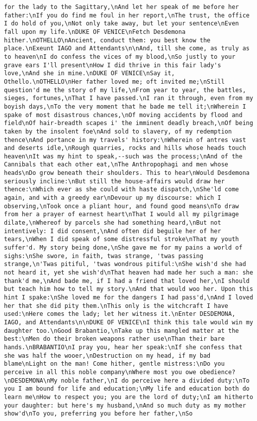 \begin{verbatim}
for the lady to the Sagittary,\nAnd let her speak of me before her father:\nIf you do find me foul in her report,\nThe trust, the office I do hold of you,\nNot only take away, but let your sentence\nEven fall upon my life.\nDUKE OF VENICE\nFetch Desdemona hither.\nOTHELLO\nAncient, conduct them: you best know the place.\nExeunt IAGO and Attendants\n\nAnd, till she come, as truly as to heaven\nI do confess the vices of my blood,\nSo justly to your grave ears I'll present\nHow I did thrive in this fair lady's love,\nAnd she in mine.\nDUKE OF VENICE\nSay it, Othello.\nOTHELLO\nHer father loved me; oft invited me;\nStill question'd me the story of my life,\nFrom year to year, the battles, sieges, fortunes,\nThat I have passed.\nI ran it through, even from my boyish days,\nTo the very moment that he bade me tell it;\nWherein I spake of most disastrous chances,\nOf moving accidents by flood and field\nOf hair-breadth scapes i' the imminent deadly breach,\nOf being taken by the insolent foe\nAnd sold to slavery, of my redemption thence\nAnd portance in my travels' history:\nWherein of antres vast and deserts idle,\nRough quarries, rocks and hills whose heads touch heaven\nIt was my hint to speak,--such was the process;\nAnd of the Cannibals that each other eat,\nThe Anthropophagi and men whose heads\nDo grow beneath their shoulders. This to hear\nWould Desdemona seriously incline:\nBut still the house-affairs would draw her thence:\nWhich ever as she could with haste dispatch,\nShe'ld come again, and with a greedy ear\nDevour up my discourse: which I observing,\nTook once a pliant hour, and found good means\nTo draw from her a prayer of earnest heart\nThat I would all my pilgrimage dilate,\nWhereof by parcels she had something heard,\nBut not intentively: I did consent,\nAnd often did beguile her of her tears,\nWhen I did speak of some distressful stroke\nThat my youth suffer'd. My story being done,\nShe gave me for my pains a world of sighs:\nShe swore, in faith, twas strange, 'twas passing strange,\n'Twas pitiful, 'twas wondrous pitiful:\nShe wish'd she had not heard it, yet she wish'd\nThat heaven had made her such a man: she thank'd me,\nAnd bade me, if I had a friend that loved her,\nI should but teach him how to tell my story.\nAnd that would woo her. Upon this hint I spake:\nShe loved me for the dangers I had pass'd,\nAnd I loved her that she did pity them.\nThis only is the witchcraft I have used:\nHere comes the lady; let her witness it.\nEnter DESDEMONA, IAGO, and Attendants\n\nDUKE OF VENICE\nI think this tale would win my daughter too.\nGood Brabantio,\nTake up this mangled matter at the best:\nMen do their broken weapons rather use\nThan their bare hands.\nBRABANTIO\nI pray you, hear her speak:\nIf she confess that she was half the wooer,\nDestruction on my head, if my bad blame\nLight on the man! Come hither, gentle mistress:\nDo you perceive in all this noble company\nWhere most you owe obedience?\nDESDEMONA\nMy noble father,\nI do perceive here a divided duty:\nTo you I am bound for life and education;\nMy life and education both do learn me\nHow to respect you; you are the lord of duty;\nI am hitherto your daughter: but here's my husband,\nAnd so much duty as my mother show'd\nTo you, preferring you before her father,\nSo 
\end{verbatim}

